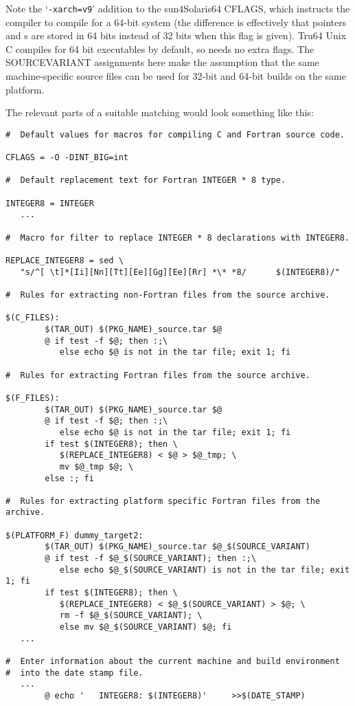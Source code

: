 \documentclass[twoside,11pt]{article}
\renewcommand{\_}{\texttt{\symbol{95}}}
\begin{document}
Note the `{\tt -xarch=v9}' addition to the sun4\_Solaris\_64 CFLAGS,
which instructs the compiler to compile for a 64-bit system
(the difference is effectively that pointers and s are stored in
64 bits instead of 32 bits when this flag is given).
Tru64 Unix C compiles for 64 bit executables by default, so needs no
extra flags.
The SOURCE\_VARIANT assignments here make the assumption that the same
machine-specific source files can be used for 32-bit and 64-bit 
builds on the same platform.

The relevant parts of a suitable matching  would look 
something like this:
\begin{squote}
\begin{verbatim}
#  Default values for macros for compiling C and Fortran source code.

CFLAGS = -O -DINT_BIG=int

#  Default replacement text for Fortran INTEGER * 8 type.

INTEGER8 = INTEGER
   ...

#  Macro for filter to replace INTEGER * 8 declarations with INTEGER8.

REPLACE_INTEGER8 = sed \
   "s/^[ \t]*[Ii][Nn][Tt][Ee][Gg][Ee][Rr] *\* *8/      $(INTEGER8)/"

#  Rules for extracting non-Fortran files from the source archive.

$(C_FILES):
        $(TAR_OUT) $(PKG_NAME)_source.tar $@
        @ if test -f $@; then :;\
           else echo $@ is not in the tar file; exit 1; fi

#  Rules for extracting Fortran files from the source archive.

$(F_FILES):
        $(TAR_OUT) $(PKG_NAME)_source.tar $@
        @ if test -f $@; then :;\
           else echo $@ is not in the tar file; exit 1; fi
        if test $(INTEGER8); then \
           $(REPLACE_INTEGER8) < $@ > $@_tmp; \
           mv $@_tmp $@; \
        else :; fi

#  Rules for extracting platform specific Fortran files from the archive.

$(PLATFORM_F) dummy_target2:
        $(TAR_OUT) $(PKG_NAME)_source.tar $@_$(SOURCE_VARIANT)
        @ if test -f $@_$(SOURCE_VARIANT); then :;\
           else echo $@_$(SOURCE_VARIANT) is not in the tar file; exit 1; fi
        if test $(INTEGER8); then \
           $(REPLACE_INTEGER8) < $@_$(SOURCE_VARIANT) > $@; \
           rm -f $@_$(SOURCE_VARIANT); \
           else mv $@_$(SOURCE_VARIANT) $@; fi
   ...

#  Enter information about the current machine and build environment
#  into the date stamp file.
   ...
        @ echo '   INTEGER8: $(INTEGER8)'     >>$(DATE_STAMP)
\end{verbatim}
\end{squote}
\end{document}
